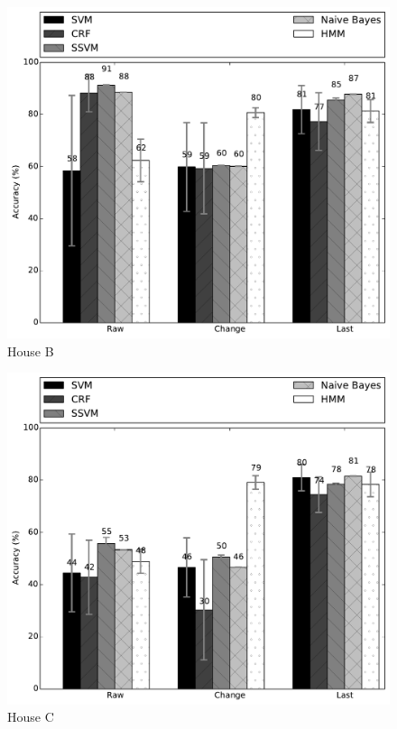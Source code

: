\documentclass[11pt, oneside]{article}   	%
\begin{document}
\begin{figure}[t!]
\begin{center}
\includegraphics[width=5in]{../../src/reports/B.pdf}
\end{center}
\vspace{-0.5cm}
\caption{House B}
\label{fig:house_b}
\vspace{-0.5cm}
\end{figure}

\begin{figure}[t!]
\begin{center}
\includegraphics[width=5in]{../../src/reports/C.pdf}
\end{center}
\vspace{-0.5cm}
\caption{House C}
\label{fig:house_3}
\vspace{-0.5cm}
\end{figure}
\end{document}
